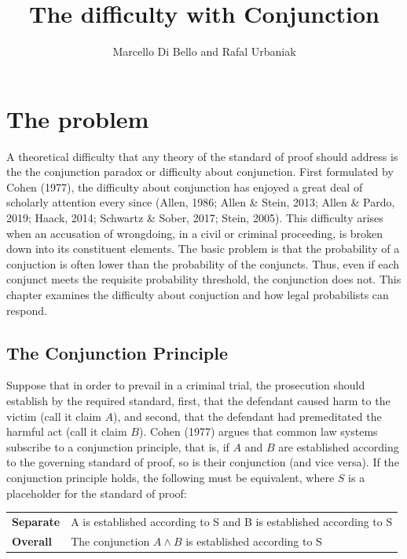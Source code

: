 \documentclass[10pt,dvipsnames,enabledeprecatedfontcommands]{scrartcl}
\title{The difficulty with Conjunction}
\author{Marcello Di Bello and Rafal Urbaniak}
\date{}
\newcommand{\et}{\wedge}
\begin{document}
\maketitle

\tableofcontents

\hypertarget{the-problem}{%
\section{The problem}\label{the-problem}}

A theoretical difficulty that any theory of the standard of proof should
address is the the conjunction paradox or difficulty about conjunction.
First formulated by Cohen (1977), the difficulty about conjunction has
enjoyed a great deal of scholarly attention every since (Allen, 1986;
Allen \& Stein, 2013; Allen \& Pardo, 2019; Haack, 2014; Schwartz \&
Sober, 2017; Stein, 2005). This difficulty arises when an accusation of
wrongdoing, in a civil or criminal proceeding, is broken down into its
constituent elements. The basic problem is that the probability of a
conjuction is often lower than the probability of the conjuncts. Thus,
even if each conjunct meets the requisite probability threshold, the
conjunction does not. This chapter examines the difficulty about
conjuction and how legal probabilists can respond.

\hypertarget{the-conjunction-principle}{%
\subsection{The Conjunction Principle}\label{the-conjunction-principle}}

Suppose that in order to prevail in a criminal trial, the prosecution
should establish by the required standard, first, that the defendant
caused harm to the victim (call it claim \(A\)), and second, that the
defendant had premeditated the harmful act (call it claim \(B\)). Cohen
(1977) argues that common law systems subscribe to a conjunction
principle, that is, if \(A\) and \(B\) are established according to the
governing standard of proof, so is their conjunction (and vice versa).
If the conjunction principle holds, the following must be equivalent,
where \(S\) is a placeholder for the standard of proof:

\begin{center}
\begin{tabular}
{@{}ll@{}}
\toprule
\textbf{Separate} &   A is established according to S and B is established according to S\\   
\textbf{Overall}  &   The conjunction $A \et B$ is established according to S  \\ 
\bottomrule
\end{tabular}
\end{center}
\end{document}
